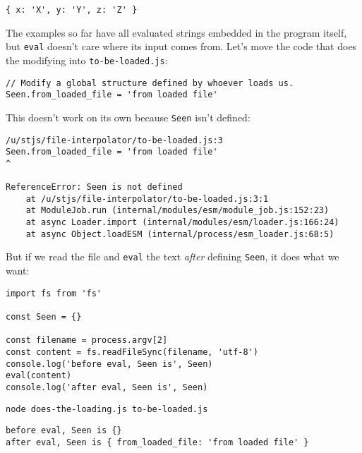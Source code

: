 \documentclass[krantzl]{krantz}
\begin{document}
\begin{lstlisting}[frame=tblr,backgroundcolor=\color{black!5}]
{ x: 'X', y: 'Y', z: 'Z' }
\end{lstlisting}



The examples so far have all evaluated strings embedded in the program itself,
but \texttt{eval} doesn’t care where its input comes from.
Let’s move the code that does the modifying into \texttt{to-be-loaded.js}:


\begin{lstlisting}[frame=tblr]
// Modify a global structure defined by whoever loads us.
Seen.from_loaded_file = 'from loaded file'
\end{lstlisting}



\noindent This doesn’t work on its own because \texttt{Seen} isn’t defined:


\begin{lstlisting}[frame=tblr,backgroundcolor=\color{black!5}]
/u/stjs/file-interpolator/to-be-loaded.js:3
Seen.from_loaded_file = 'from loaded file'
^

ReferenceError: Seen is not defined
    at /u/stjs/file-interpolator/to-be-loaded.js:3:1
    at ModuleJob.run (internal/modules/esm/module_job.js:152:23)
    at async Loader.import (internal/modules/esm/loader.js:166:24)
    at async Object.loadESM (internal/process/esm_loader.js:68:5)
\end{lstlisting}



\noindent But if we read the file and \texttt{eval} the text \emph{after} defining \texttt{Seen},
it does what we want:


\begin{lstlisting}[frame=tblr]
import fs from 'fs'

const Seen = {}

const filename = process.argv[2]
const content = fs.readFileSync(filename, 'utf-8')
console.log('before eval, Seen is', Seen)
eval(content)
console.log('after eval, Seen is', Seen)
\end{lstlisting}



\begin{lstlisting}[frame=shadowbox]
node does-the-loading.js to-be-loaded.js
\end{lstlisting}



\begin{lstlisting}[frame=tblr,backgroundcolor=\color{black!5}]
before eval, Seen is {}
after eval, Seen is { from_loaded_file: 'from loaded file' }
\end{lstlisting}
\end{document}
